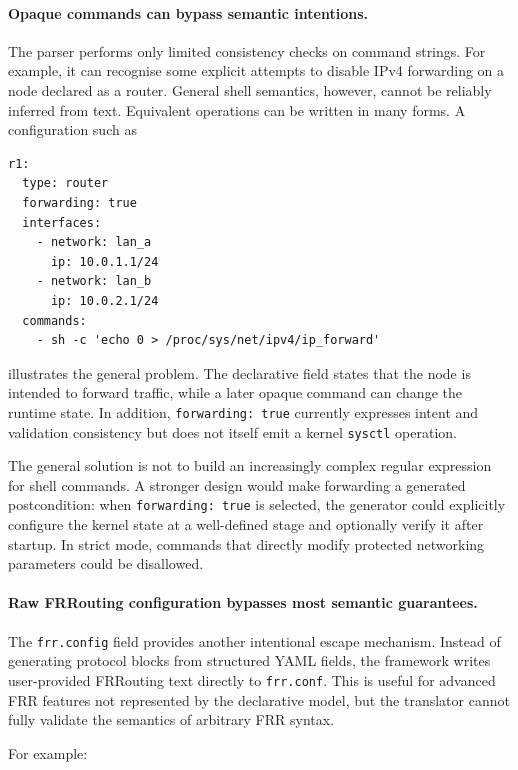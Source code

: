 \paragraph{Opaque commands can bypass semantic intentions.}
The parser performs only limited consistency checks on command strings. For
example, it can recognise some explicit attempts to disable IPv4 forwarding on
a node declared as a router. General shell semantics, however, cannot be
reliably inferred from text. Equivalent operations can be written in many
forms. A configuration such as

\begin{lstlisting}[caption={Equivalent command that changes a forwarding runtime property.},
label={lst:forwarding-bypass-example}]
r1:
  type: router
  forwarding: true
  interfaces:
    - network: lan_a
      ip: 10.0.1.1/24
    - network: lan_b
      ip: 10.0.2.1/24
  commands:
    - sh -c 'echo 0 > /proc/sys/net/ipv4/ip_forward'
\end{lstlisting}

illustrates the general problem. The declarative field states that the node is
intended to forward traffic, while a later opaque command can change the
runtime state. In addition, \texttt{forwarding: true} currently expresses
intent and validation consistency but does not itself emit a kernel
\texttt{sysctl} operation.

The general solution is not to build an increasingly complex regular
expression for shell commands. A stronger design would make forwarding a
generated postcondition: when \texttt{forwarding: true} is selected, the
generator could explicitly configure the kernel state at a well-defined stage
and optionally verify it after startup. In strict mode, commands that directly
modify protected networking parameters could be disallowed.

\paragraph{Raw FRRouting configuration bypasses most semantic guarantees.}
The \texttt{frr.config} field provides another intentional escape mechanism.
Instead of generating protocol blocks from structured YAML fields, the
framework writes user-provided FRRouting text directly to
\texttt{frr.conf}. This is useful for advanced FRR features not represented by
the declarative model, but the translator cannot fully validate the semantics
of arbitrary FRR syntax.

For example:

